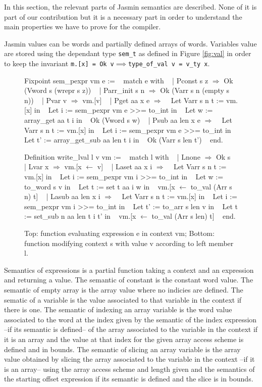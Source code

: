 \documentclass{article}
\begin{document}
In this section, the relevant parts of Jasmin semantics are described. None of
it is part of our contribution but it is a necessary part in order to understand
the main properties we have to prove for the compiler.

Jasmin values can be words and partially defined arrays of words. Variables value
are stored using the dependant type \texttt{sem\_t} as defined in Figure
\ref{fig:val} in order to keep the invariant
\texttt{m.[x] = Ok v\(\implies\)type\_of\_val v = v\_ty x}.

\medskip

\begin{figure}[!t]
\obeylines\obeyspaces\ttfamily%
Fixpoint sem\_pexpr vm e :=
~ match e with
~ | Pconst s z \(\Rightarrow\) Ok (Vword s (wrepr s z))
~ | Parr\_init s n \(\Rightarrow\) Ok (Varr s n (empty s n))
~ | Pvar v \(\Rightarrow\) vm.[v]
~ | Pget aa x e \(\Rightarrow\)
~   Let Varr s n t := vm.[x] in
~   Let i := sem\_pexpr vm e >{}>= to\_int in
~   Let w := array\_get aa t i in
~   Ok (Vword s w)
~ | Psub aa len x e \(\Rightarrow\)
~   Let Varr s n t := vm.[x] in
~   Let i := sem\_pexpr vm e >{}>= to\_int in
~   Let t' := array\_get\_sub aa len t i in
~   Ok (Varr s len t')
~ end.

Definition write\_lval l v vm :=
~ match l with
~ | Lnone \(\Rightarrow\) Ok s
~ | Lvar x \(\Rightarrow\) vm.[x \(\leftarrow\) v]
~ | Laset aa x i \(\Rightarrow\)
~   Let Varr s n t := vm.[x] in
~   Let i := sem\_pexpr vm i >{}>= to\_int in
~   Let w := to\_word s v in
~   Let t := set t aa i w in
~   vm.[x \(\leftarrow\) to\_val (Arr s n) t]
~ | Lasub aa len x i \(\Rightarrow\)
~   Let Varr s n t := vm.[x] in
~   Let i := sem\_pexpr vm i >{}>= to\_int in
~   Let t' := to\_arr s len v in 
~   Let t := set\_sub n aa len t i t' in
~   vm.[x \(\leftarrow\) to\_val (Arr s len) t]
~ end.
\normalfont%
\caption{Top: function evaluating expression e in context vm; %
Bottom: function modifying context s with value v according to left member l.}
\end{figure}

Semantics of expressions is a partial function taking a context and an
expression and returning a value.
The semantic of constant is the constant word value. The semantic of empty array
is the array value where no indicies are defined. The sematic of a variable is
the value associated to that variable in the context if there is one. The
semantic of indexing an array variable is the word value associated to the word
at the index given by the semantic of the index expression --if its semantic
is defined-- of the array associated to the variable in the context if it is an
array and the value at that index for the given array access scheme is defined
and in bounds. The semantic of slicing an array variable is the array value
obtained by slicing the array associated to the variable in the context --if it
is an array-- using the array access scheme and length given and the semantics
of the starting offset expression if its semantic is defined and the slice is in
bounds.
\end{document}
